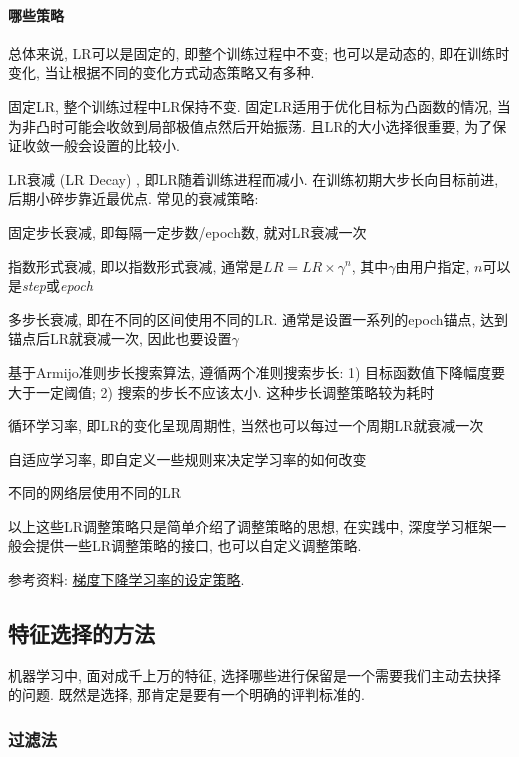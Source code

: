 \paragraph{哪些策略}总体来说, LR可以是固定的, 即整个训练过程中不变; 也可以是动态的, 即在训练时变化, 当让根据不同的变化方式动态策略又有多种. 
\begin{myitemize}
	\item 固定LR, 整个训练过程中LR保持不变. 固定LR适用于优化目标为凸函数的情况, 当为非凸时可能会收敛到局部极值点然后开始振荡. 且LR的大小选择很重要, 为了保证收敛一般会设置的比较小. 
	\item LR衰减 (LR Decay) , 即LR随着训练进程而减小. 在训练初期大步长向目标前进, 后期小碎步靠近最优点. 常见的衰减策略: 
	\begin{myitemize}
		\item 固定步长衰减, 即每隔一定步数/epoch数, 就对LR衰减一次
		\item 指数形式衰减, 即以指数形式衰减, 通常是$LR = LR \times \gamma^{n}$, 其中$\gamma$由用户指定, $n$可以是\textit{step}或\textit{epoch}
		\item 多步长衰减, 即在不同的区间使用不同的LR. 通常是设置一系列的epoch锚点, 达到锚点后LR就衰减一次, 因此也要设置$\gamma$
	\end{myitemize}
	\item 基于Armijo准则步长搜索算法, 遵循两个准则搜索步长: 1) 目标函数值下降幅度要大于一定阈值; 2) 搜索的步长不应该太小. 这种步长调整策略较为耗时
	\item 循环学习率, 即LR的变化呈现周期性, 当然也可以每过一个周期LR就衰减一次
	\item 自适应学习率, 即自定义一些规则来决定学习率的如何改变
	\item 不同的网络层使用不同的LR
\end{myitemize}
以上这些LR调整策略只是简单介绍了调整策略的思想, 在实践中, 深度学习框架一般会提供一些LR调整策略的接口, 也可以自定义调整策略. 

参考资料: \href{https://lumingdong.cn/setting-strategy-of-gradient-descent-learning-rate.html}{梯度下降学习率的设定策略}. 

\subsection{特征选择的方法}
机器学习中, 面对成千上万的特征, 选择哪些进行保留是一个需要我们主动去抉择的问题. 既然是选择, 那肯定是要有一个明确的评判标准的. 

\subsubsection{过滤法}


